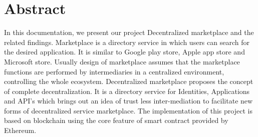 \chapter*{Abstract}
\label{cha:abstract}

In this documentation, we present our project Decentralized marketplace and the related findings. Marketplace is a directory service in which users can search for the desired application. It is similar to Google play store, Apple app store and Microsoft store. Usually design of marketplace assumes that the marketplace functions are performed by intermediaries in a centralized environment, controlling the whole ecosystem. Decentralized marketplace proposes the concept of complete decentralization. It is a directory service for Identities, Applications and API's which brings out an idea of trust less inter-mediation to facilitate new forms of decentralized service marketplace. The implementation of this project is based on blockchain using the core feature of smart contract provided by Ethereum.
